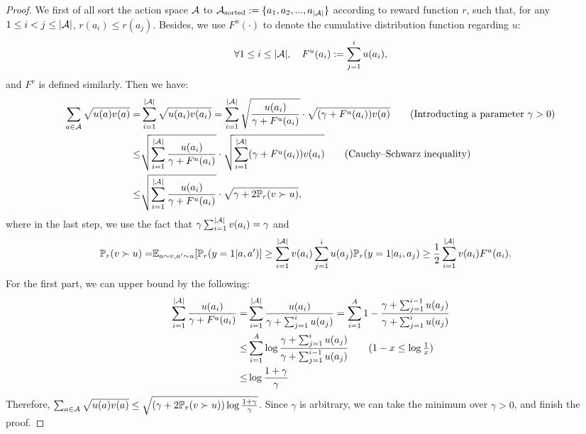 \begin{proof}
    We first of all sort the action space $\mathcal{A}$ to $\mathcal{A}_{\text{sorted}} := \{a_1,a_2,...,a_{|\mathcal{A}|}\}$ according to reward function $r$, such that, for any $1\leq i<j \leq |\mathcal{A}|$, $r(a_i) \leq r(a_j)$.
    Besides, we use $F^u(\cdot)$ to denote the cumulative distribution function regarding $u$:
    $$
        \forall 1\leq i \leq |\mathcal{A}|,\quad F^u(a_i) := \sum_{j=1}^{i} u(a_i),
    $$
    and $F^{v}$ is defined similarly. Then we have:
    \begin{align*}
        \sum_{a\in\mathcal{A}} \sqrt{u(a)v(a)} =& \sum_{i=1}^{|\mathcal{A}|} \sqrt{u(a_i)v(a_i)} = \sum_{i=1}^{|\mathcal{A}|} \sqrt{\frac{u(a_i)}{\gamma + F^u(a_i)}} \cdot \sqrt{(\gamma + F^u(a_i))v(a)} \tag{Introducting a parameter $\gamma > 0$}\\
        \leq & \sqrt{\sum_{i=1}^{|\mathcal{A}|} \frac{u(a_i)}{\gamma + F^u(a_i)}} \cdot \sqrt{\sum_{i=1}^{|\mathcal{A}|}  (\gamma + F^u(a_i))v(a_i)} \tag{Cauchy–Schwarz inequality}\\
        \leq & \sqrt{\sum_{i=1}^{|\mathcal{A}|} \frac{u(a_i)}{\gamma + F^u(a_i)}} \cdot \sqrt{\gamma + 2{\mathbb{P}}_r(v\succ u)},
    \end{align*}
    where in the last step, we use the fact that $\gamma\sum_{i=1}^{|\mathcal{A}|} v(a_i) = \gamma$ and 
    \begin{align*}
        {\mathbb{P}}_r(v\succ u) =& \mathbb{E}_{a\sim v,a' \sim u}[{\mathbb{P}}_r(y=1|a,a')] \geq \sum_{i=1}^{|\mathcal{A}|} v(a_i) \sum_{j=1}^i u(a_j) {\mathbb{P}}_r(y=1|a_i,a_j) \geq \frac{1}{2}\sum_{i=1}^{|\mathcal{A}|} v(a_i) F^u(a_i).
    \end{align*}
    For the first part, we can upper bound by the following:
    \begin{align*}
        \sum_{i=1}^{|\cA|} \frac{u(a_i)}{\gamma + F^u(a_i)} = & \sum_{i=1}^{|\cA|} \frac{u(a_i)}{\gamma + \sum_{j=1}^{i} u(a_j)} = \sum_{i=1}^A 1 - \frac{\gamma + \sum_{j=1}^{i-1} u(a_j)}{\gamma + \sum_{j=1}^{i} u(a_j)} \\
        \leq & \sum_{i=1}^A \log \frac{\gamma + \sum_{j=1}^{i} u(a_j)}{\gamma + \sum_{j=1}^{i-1} u(a_j)} \tag{$1 - x \leq \log \frac{1}{x}$} \\
        \leq & \log \frac{1+\gamma}{\gamma}
    \end{align*}
    Therefore, $\sum_{a\in\mathcal{A}}\sqrt{u(a)v(a)} \leq \sqrt{(\gamma + 2{\mathbb{P}}_r(v\succ u))\log\frac{1+\gamma}{\gamma}}$.
    Since $\gamma$ is arbitrary, we can take the minimum over $\gamma > 0$, and finish the proof.
\end{proof}


%
%
%
%
%
%
%
%
%
%
%
%
%
%
%
%
%
%
%
%


